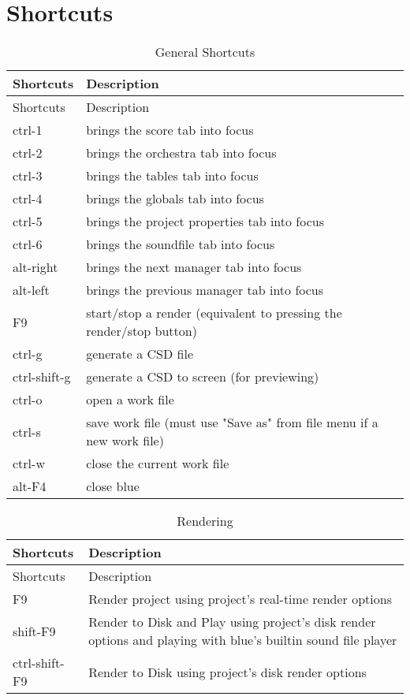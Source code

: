 \section{Shortcuts}\label{shortcuts}

\begin{longtable}[]{@{}ll@{}}
\caption{General Shortcuts}\tabularnewline
\toprule
Shortcuts & Description\tabularnewline
\midrule
\endfirsthead
\toprule
Shortcuts & Description\tabularnewline
\midrule
\endhead
ctrl-1 & brings the score tab into focus\tabularnewline
ctrl-2 & brings the orchestra tab into focus\tabularnewline
ctrl-3 & brings the tables tab into focus\tabularnewline
ctrl-4 & brings the globals tab into focus\tabularnewline
ctrl-5 & brings the project properties tab into focus\tabularnewline
ctrl-6 & brings the soundfile tab into focus\tabularnewline
alt-right & brings the next manager tab into focus\tabularnewline
alt-left & brings the previous manager tab into focus\tabularnewline
F9 & start/stop a render (equivalent to pressing the render/stop
button)\tabularnewline
ctrl-g & generate a CSD file\tabularnewline
ctrl-shift-g & generate a CSD to screen (for previewing)\tabularnewline
ctrl-o & open a work file\tabularnewline
ctrl-s & save work file (must use "Save as" from file menu if a new work
file)\tabularnewline
ctrl-w & close the current work file\tabularnewline
alt-F4 & close blue\tabularnewline
\bottomrule
\end{longtable}

\begin{longtable}[]{@{}ll@{}}
\caption{Rendering}\tabularnewline
\toprule
Shortcuts & Description\tabularnewline
\midrule
\endfirsthead
\toprule
Shortcuts & Description\tabularnewline
\midrule
\endhead
F9 & Render project using project's real-time render
options\tabularnewline
shift-F9 & Render to Disk and Play using project's disk render options
and playing with blue's builtin sound file player\tabularnewline
ctrl-shift-F9 & Render to Disk using project's disk render
options\tabularnewline
\bottomrule
\end{longtable}

